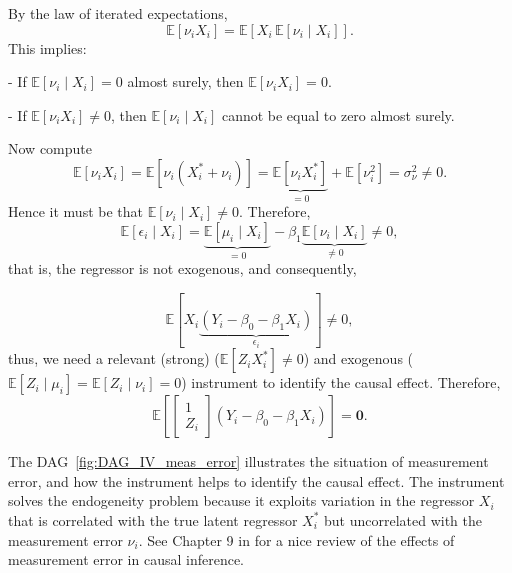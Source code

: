 By the law of iterated expectations, 
\[
\mathbb{E}[\nu_i X_i] = \mathbb{E}\!\left[X_i \, \mathbb{E}[\nu_i \mid X_i]\right].
\]
This implies:

- If $\mathbb{E}[\nu_i \mid X_i] = 0$ almost surely, then $\mathbb{E}[\nu_i X_i] = 0$.  

- If $\mathbb{E}[\nu_i X_i] \neq 0$, then $\mathbb{E}[\nu_i \mid X_i]$ cannot be equal to zero almost surely.

Now compute
\[
\mathbb{E}[\nu_iX_i] 
= \mathbb{E}[\nu_i(X_i^*+\nu_i)]
= \underbrace{\mathbb{E}[\nu_i X_i^*]}_{=0} + \mathbb{E}[\nu_i^2]
= \sigma^2_{\nu} \neq 0.
\]
Hence it must be that $\mathbb{E}[\nu_i\mid X_i]\neq 0$. Therefore,
\[
\mathbb{E}[\epsilon_i\mid X_i]
=\underbrace{\mathbb{E}[\mu_i\mid X_i]}_{=0}
- \beta_1\underbrace{\mathbb{E}[\nu_i\mid X_i]}_{\neq 0}
\neq 0,
\]
that is, the regressor is not exogenous, and consequently,

\[
\mathbb{E}[X_i\underbrace{(Y_i-\beta_0-\beta_1X_i)}_{\epsilon_i}]\neq 0,
\] 
thus, we need a relevant (strong) ($\mathbb{E}[Z_iX_i^*]\neq 0$) and exogenous ($\mathbb{E}[Z_i\mid \mu_i]=\mathbb{E}[Z_i\mid \nu_i]= 0$) instrument to identify the causal effect. Therefore,
\[
\mathbb{E}\left[\begin{bmatrix}
	1\\
	Z_i
\end{bmatrix}(Y_i-\beta_0-\beta_1X_i)\right]=\mathbf{0}.
\] 

The DAG~\ref{fig:DAG_IV_meas_error} illustrates the situation of measurement error, and how the instrument helps to identify the causal effect. The instrument solves the endogeneity problem because it exploits variation in the regressor $X_i$ that is correlated with the true latent regressor $X_i^*$ but uncorrelated with the measurement error $\nu_i$. See Chapter 9 in \cite{hernan2020causal} for a nice review of the effects of measurement error in causal inference.

